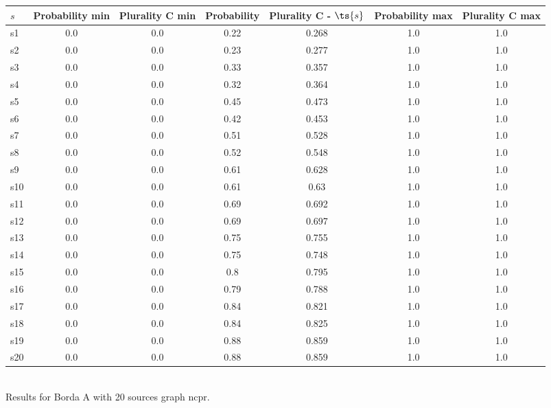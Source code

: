 \documentclass{article}
\begin{document}
\noindent\begin{tabular}{|l|c|c|c|c|c|c|}
\hline
$s$& Probability min & Plurality C min & Probability & Plurality C - $\ts{s}$ & Probability max & Plurality C max\\
\hline
s1 &0.0 & 0.0 & 0.22 & 0.268 & 1.0 & 1.0\\
\hline
s2 &0.0 & 0.0 & 0.23 & 0.277 & 1.0 & 1.0\\
\hline
s3 &0.0 & 0.0 & 0.33 & 0.357 & 1.0 & 1.0\\
\hline
s4 &0.0 & 0.0 & 0.32 & 0.364 & 1.0 & 1.0\\
\hline
s5 &0.0 & 0.0 & 0.45 & 0.473 & 1.0 & 1.0\\
\hline
s6 &0.0 & 0.0 & 0.42 & 0.453 & 1.0 & 1.0\\
\hline
s7 &0.0 & 0.0 & 0.51 & 0.528 & 1.0 & 1.0\\
\hline
s8 &0.0 & 0.0 & 0.52 & 0.548 & 1.0 & 1.0\\
\hline
s9 &0.0 & 0.0 & 0.61 & 0.628 & 1.0 & 1.0\\
\hline
s10 &0.0 & 0.0 & 0.61 & 0.63 & 1.0 & 1.0\\
\hline
s11 &0.0 & 0.0 & 0.69 & 0.692 & 1.0 & 1.0\\
\hline
s12 &0.0 & 0.0 & 0.69 & 0.697 & 1.0 & 1.0\\
\hline
s13 &0.0 & 0.0 & 0.75 & 0.755 & 1.0 & 1.0\\
\hline
s14 &0.0 & 0.0 & 0.75 & 0.748 & 1.0 & 1.0\\
\hline
s15 &0.0 & 0.0 & 0.8 & 0.795 & 1.0 & 1.0\\
\hline
s16 &0.0 & 0.0 & 0.79 & 0.788 & 1.0 & 1.0\\
\hline
s17 &0.0 & 0.0 & 0.84 & 0.821 & 1.0 & 1.0\\
\hline
s18 &0.0 & 0.0 & 0.84 & 0.825 & 1.0 & 1.0\\
\hline
s19 &0.0 & 0.0 & 0.88 & 0.859 & 1.0 & 1.0\\
\hline
s20 &0.0 & 0.0 & 0.88 & 0.859 & 1.0 & 1.0\\
\hline
\end{tabular}\\

\noindent Results for Borda A with 20 sources graph ncpr.
\end{document}
